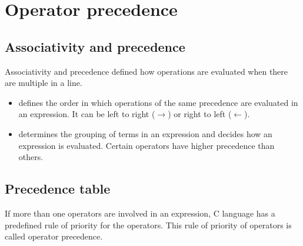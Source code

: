 \section{Operator precedence}


\subsection{Associativity and precedence}

Associativity and precedence defined how operations are evaluated when there are multiple in a line.
\begin{itemize}
    \item {} defines the order in which operations of the same precedence are evaluated in an expression. It can be left to right ($\rightarrow$) or right to left ($\leftarrow$).
    \item {}  determines the grouping of terms in an expression and decides how an expression is evaluated. Certain operators have higher precedence than others.
\end{itemize}


\subsection{Precedence table}

If more than one operators are involved in an expression, C language has a predefined rule of priority for the operators. This rule of priority of operators is called operator precedence.



